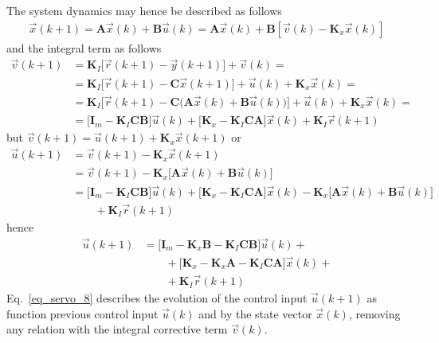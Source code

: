 \documentclass[11pt,a4paper,oneside]{book}
\numberwithin{equation}{section}
\theoremstyle{it}
\theoremstyle{definition}
\begin{document}
The system dynamics may hence be described as follows
\begin{equation}\label{eq_servo_6}
	\begin{aligned}
		\vec{x}(k+1) = \mathbf{A}\vec{x}(k)+\mathbf{B}\vec{u}(k) = 
		\mathbf{A}\vec{x}(k)+\mathbf{B}\left[ 
		\vec{v}(k)-\mathbf{K}_x\vec{x}(k)\right] 
	\end{aligned}
\end{equation}
and the integral term as follows
\begin{equation}\label{eq_servo_7}
	\begin{aligned}
		\vec{v}(k+1) &= 
		\mathbf{K}_I\Big[\vec{r}(k+1)-\vec{y}(k+1)\Big]+\vec{v}(k)= \\[6pt]  
		&= 
		\mathbf{K}_I\Big[\vec{r}(k+1)-\mathbf{C}\vec{x}(k+1)\Big]+\vec{u}(k)+\mathbf{K}_x\vec{x}(k)=
		\\[6pt]
		&= \mathbf{K}_I\Big[\vec{r}(k+1)-\mathbf{C} \Big( 
		\mathbf{A}\vec{x}(k)+\mathbf{B}\vec{u}(k) \Big)  
		\Big]+\vec{u}(k)+\mathbf{K}_x\vec{x}(k)= \\[6pt]
		&= \Big[\mathbf{I}_m - \mathbf{K}_I\mathbf{C}\mathbf{B} \Big] 
		\vec{u}(k) + \Big[\mathbf{K}_x 
		-\mathbf{K}_I\mathbf{C}\mathbf{A}\Big] \vec{x}(k) + 
		\mathbf{K}_I\vec{r}(k+1)
	\end{aligned}
\end{equation}
but $\vec{v}(k+1)=\vec{u}(k+1)+\mathbf{K}_x\vec{x}(k+1)$ or
\begin{equation}
	\begin{aligned}
		\vec{u}(k+1) &= \vec{v}(k+1) - \mathbf{K}_x\vec{x}(k+1)  \\[6pt]
		&= \vec{v}(k+1) - \mathbf{K}_x\Big[\mathbf{A}\vec{x}(k)+\mathbf{B}\vec{u}(k)\Big] \\[6pt]
		&= \Big[\mathbf{I}_m - \mathbf{K}_I\mathbf{C}\mathbf{B} \Big] 
		\vec{u}(k) + \Big[\mathbf{K}_x 
		-\mathbf{K}_I\mathbf{C}\mathbf{A}\Big] \vec{x}(k) - \mathbf{K}_x\Big[\mathbf{A}\vec{x}(k)+\mathbf{B}\vec{u}(k)\Big] \\[6pt]
		&\qquad+ \mathbf{K}_I\vec{r}(k+1)
	\end{aligned}
\end{equation}
hence 
\begin{equation}\label{eq_servo_8}
	\begin{aligned}
		\vec{u}(k+1) &= 
		\Big[\mathbf{I}_m-\mathbf{K}_x\mathbf{B}-\mathbf{K}_I\mathbf{C}\mathbf{B}
		\Big] \vec{u}(k) + \\[6pt]
		&\qquad+\Big[\mathbf{K}_x - 
		\mathbf{K}_x\mathbf{A}-\mathbf{K}_I\mathbf{C}\mathbf{A} \Big] 
		\vec{x}(k) + \\[6pt]
		&\qquad+  \mathbf{K}_I\vec{r}(k+1)
	\end{aligned}
\end{equation}
Eq.~\eqref{eq_servo_8} describes the evolution of the control input $\vec{u}(k+1)$ as function previous control input $\vec{u}(k)$ and by the state vector $\vec{x}(k)$, removing any relation with the integral corrective term $\vec{v}(k)$.
\end{document}
